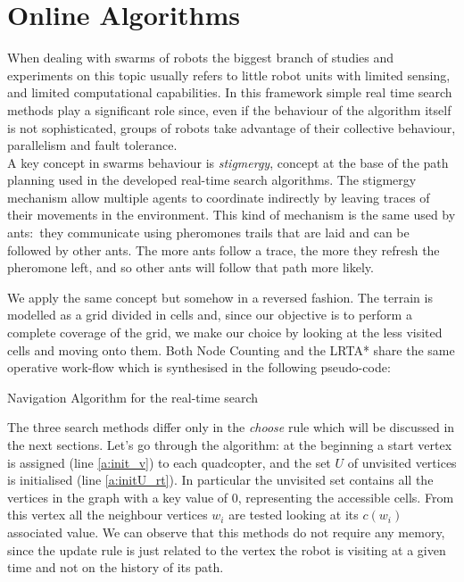 \chapter{Online Algorithms}

When dealing with swarms of robots the biggest branch of studies and experiments on this topic usually refers to little robot units with limited sensing, and limited computational capabilities. In this framework simple real time search methods play a significant role since, even if the behaviour of the algorithm itself is not sophisticated, groups of robots take advantage of their collective behaviour, parallelism and fault tolerance. \\
A key concept in swarms behaviour is \emph{stigmergy}, concept at the base of the path planning used in the developed real-time search algorithms.  The stigmergy mechanism allow multiple agents to coordinate indirectly by leaving traces of their movements in the environment. This kind of mechanism is the same used by ants:~they communicate using pheromones trails that are laid and can be followed by other ants. The more ants follow a trace, the more they refresh the pheromone left, and so other ants will follow that path more likely.

We apply the same concept but somehow in a reversed fashion. The terrain is modelled as a grid divided in cells and, since our objective is to perform a complete coverage of the grid, we make our choice by looking at the less visited cells and moving onto them. Both Node Counting and the LRTA* share the same operative work-flow which is synthesised in the following pseudo-code:

\begin{algorithm}
\caption{Navigation Algorithm for the real-time search}
\label{alg:rt_gen}
\begin{algorithmic} [1]
 \label{a:init_v}
 \label{a:initU_rt}
\label{a:bigWhile_rt}
\ENDWHILE
\end{algorithmic}
\end{algorithm}

The three search methods differ only in the \emph{choose} rule which will be discussed in the next sections. 
Let's go through the algorithm: at the beginning a start vertex is assigned (line \ref{a:init_v}) to each quadcopter, and the set $U$ of unvisited vertices is initialised (line \ref{a:initU_rt}). In particular the unvisited set contains all the vertices in the graph with a key value of 0, representing the accessible cells. From this vertex all the neighbour vertices $w_i$ are tested looking at its $c(w_i)$ associated value. We can observe that this methods do not require any memory, since the update rule is just related to the vertex the robot is visiting at a given time and not on the history of its path.

